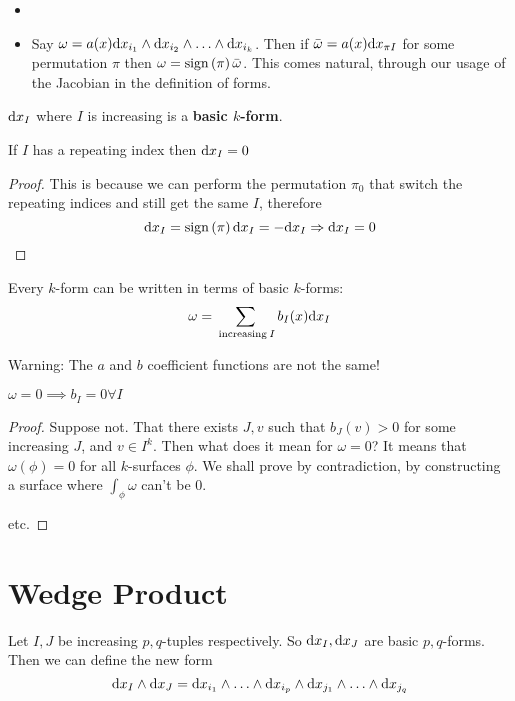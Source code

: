 \documentclass[a4paper, 11pt]{article}
\begin{document}
\begin{properties}
\begin{itemize}
\item []
\item Say $\omega = a(x) \mathrm{d} x_{i_1} \wedge \mathrm{d} x_{i_2} \wedge \ldots \wedge \mathrm{d} x_{i_k}$. Then if $\bar{\omega} = a(x) \mathrm{d} x_{\pi I}$ for some permutation $\pi$ then $\omega = \mathrm{sign}\left(\pi\right) \bar{\omega}$. This comes natural, through our usage of the Jacobian in the definition of forms.
\end{itemize}
\end{properties}

\begin{definition} 
    $\mathrm{d} x_I$ where $I$ is increasing is a \textbf{basic $k$-form}.
\end{definition}

\begin{proposition}
If $I$ has a repeating index then $\mathrm{d} x_I = 0$
\end{proposition}
\begin{proof}
    This is because we can perform the permutation $\pi_0$ that switch the repeating indices and still get the same $I$, therefore \begin{equation*}
        \mathrm{d} x_I = \mathrm{sign}\left(\pi\right)\mathrm{d} x_I = -\mathrm{d} x_I \Rightarrow \mathrm{d} x_I = 0
    \end{equation*}
\end{proof}
\begin{corollary}
    Every $k$-form can be written in terms of basic $k$-forms:
    \begin{equation*}
    \omega = \sum_{\:\text{increasing}\: I} b_I (x) \mathrm{d} x_I
    \end{equation*}

    Warning: The $a$ and $b$ coefficient functions are not the same!
\end{corollary}

\begin{proposition}
$\omega = 0 \implies b_I = 0 \forall I$
\end{proposition}
\begin{proof}
    Suppose not. That there exists $J, v$ such that $b_J(v) > 0$ for some increasing $J$, and $v \in I^k$. Then what does it mean for $\omega = 0$? It means that $\omega(\phi) = 0$ for all $k$-surfaces $\phi$. We shall prove by contradiction, by constructing a surface where $\int_\phi \omega$ can't be 0.

    etc.
\end{proof}

\section{Wedge Product}
Let $I, J$ be increasing $p, q$-tuples respectively. So $\mathrm{d} x_I, \mathrm{d} x_J$ are basic $p, q$-forms. Then we can define the new form \begin{equation*}
\mathrm{d} x_I \wedge \mathrm{d} x_J = \mathrm{d} x_{i_1} \wedge \ldots \wedge \mathrm{d} x_{i_p} \wedge \mathrm{d} x_{j_1} \wedge \ldots \wedge \mathrm{d} x_{j_q}
\end{equation*}
\end{document}
